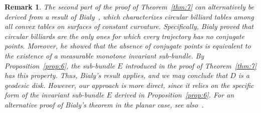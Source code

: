 \documentclass[a4paper,12pt,reqno]{amsart}
\numberwithin{equation}{section}
\newtheorem{lemma}[theorem]{Lemma}
\newtheorem{remark}[theorem]{Remark}
\newcommand{\Ee}{{\mathbb{E}}}
\begin{document}

\begin{remark}
The second part of the proof of Theorem~\ref{thm:7} can alternatively be derived from a result of Bialy~\cite{Bialy:1993ty,Bialy:2013}, which characterizes circular billiard tables among all convex tables on surfaces of constant curvature. Specifically, Bialy proved that circular billiards are the only ones for which every trajectory has no conjugate points. Moreover, he showed that the absence of conjugate points is equivalent to the existence of a measurable monotone invariant sub-bundle. By Proposition~\ref{prop:6}, the sub-bundle $E$ introduced in the proof of Theorem~\ref{thm:7} has this property. Thus, Bialy's result applies, and we may conclude that $D$ is a geodesic disk. However, our approach is more direct, since it relies on the specific form of the invariant sub-bundle $E$ derived in Proposition~\ref{prop:6}. For an alternative proof of Bialy's theorem in the planar case, see also~\cite{Wojtkowski:1994tj}.
\end{remark}



\end{document}
